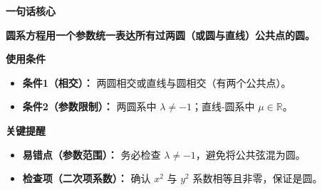 \begin{summarybox}

	\textbf{\textcolor{CSummary}{一句话核心}}

	\textbf{圆系方程用一个参数统一表达所有过两圆（或圆与直线）公共点的圆。}

	\medskip
	\textbf{\textcolor{CSummary}{使用条件}}
	\begin{itemize}[leftmargin=*, itemsep=0.5em, topsep=0.4em]
		\item \textbf{条件1（相交）：} 两圆相交或直线与圆相交（有两个公共点）。
		\item \textbf{条件2（参数限制）：} 两圆系中 $\lambda\neq -1$；直线-圆系中 $\mu\in\mathbb{R}$。
	\end{itemize}

	\medskip
	\textbf{\textcolor{CSummary}{关键提醒}}
	\begin{itemize}[leftmargin=*, itemsep=0.5em, topsep=0.4em]
		\item \textbf{易错点（参数范围）：} 务必检查 $\lambda\neq -1$，避免将公共弦混为圆。
		\item \textbf{检查项（二次项系数）：} 确认 $x^2$ 与 $y^2$ 系数相等且非零，保证是圆。
	\end{itemize}
\end{summarybox}
